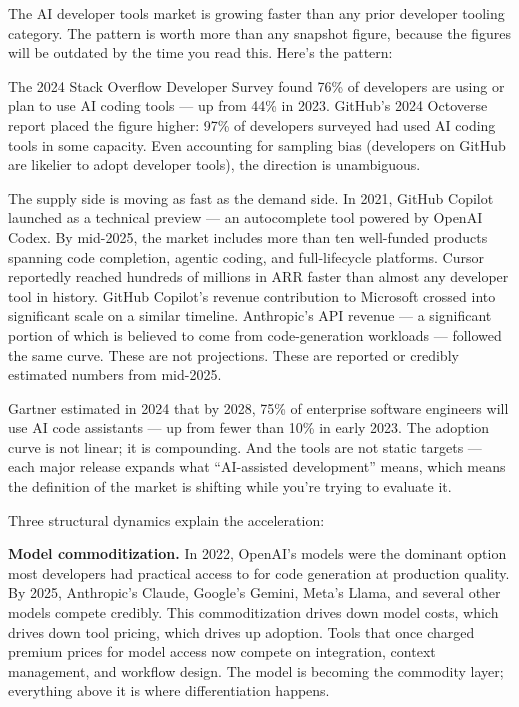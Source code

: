\documentclass[
  a4paper,
  DIV=11,
  numbers=noendperiod]{scrreprt}
\begin{document}
The AI developer tools market is growing faster than any prior developer
tooling category. The pattern is worth more than any snapshot figure,
because the figures will be outdated by the time you read this. Here's
the pattern:

The 2024 Stack Overflow Developer Survey found 76\% of developers are
using or plan to use AI coding tools --- up from 44\% in 2023. GitHub's
2024 Octoverse report placed the figure higher: 97\% of developers
surveyed had used AI coding tools in some capacity. Even accounting for
sampling bias (developers on GitHub are likelier to adopt developer
tools), the direction is unambiguous.

The supply side is moving as fast as the demand side. In 2021, GitHub
Copilot launched as a technical preview --- an autocomplete tool powered
by OpenAI Codex. By mid-2025, the market includes more than ten
well-funded products spanning code completion, agentic coding, and
full-lifecycle platforms. Cursor reportedly reached hundreds of millions
in ARR faster than almost any developer tool in history. GitHub
Copilot's revenue contribution to Microsoft crossed into significant
scale on a similar timeline. Anthropic's API revenue --- a significant
portion of which is believed to come from code-generation workloads ---
followed the same curve. These are not projections. These are reported
or credibly estimated numbers from mid-2025.

Gartner estimated in 2024 that by 2028, 75\% of enterprise software
engineers will use AI code assistants --- up from fewer than 10\% in
early 2023. The adoption curve is not linear; it is compounding. And the
tools are not static targets --- each major release expands what
``AI-assisted development'' means, which means the definition of the
market is shifting while you're trying to evaluate it.

Three structural dynamics explain the acceleration:

\textbf{Model commoditization.} In 2022, OpenAI's models were the
dominant option most developers had practical access to for code
generation at production quality. By 2025, Anthropic's Claude, Google's
Gemini, Meta's Llama, and several other models compete credibly. This
commoditization drives down model costs, which drives down tool pricing,
which drives up adoption. Tools that once charged premium prices for
model access now compete on integration, context management, and
workflow design. The model is becoming the commodity layer; everything
above it is where differentiation happens.
\end{document}
